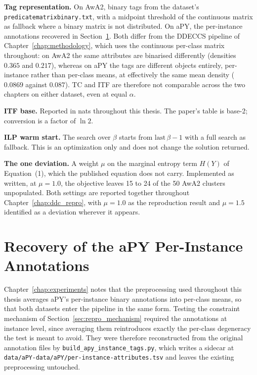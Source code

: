 \textbf{Tag representation.} On AwA2, binary tags from the dataset's \texttt{predicate\-matrix\-binary.txt}, with a midpoint threshold of the continuous matrix as fallback where a binary matrix is not distributed. On aPY, the per-instance annotations recovered in Section~\ref{sec:c_apy_tags}. Both differ from the DDECCS pipeline of Chapter~\ref{chap:methodology}, which uses the continuous per-class matrix throughout: on AwA2 the same attributes are binarised differently (densities $0.365$ and $0.217$), whereas on aPY the tags are different objects entirely, per-instance rather than per-class means, at effectively the same mean density ($0.0869$ against $0.087$). TC and ITF are therefore not comparable across the two chapters on either dataset, even at equal $\alpha$.

\textbf{ITF base.} Reported in nats throughout this thesis. The paper's table is base-2; conversion is a factor of $\ln 2$.

\textbf{ILP warm start.} The search over $\beta$ starts from $\text{last}\,\beta - 1$ with a full search as fallback. This is an optimization only and does not change the solution returned.

\textbf{The one deviation.} A weight $\mu$ on the marginal entropy term $H(Y)$ of Equation~(1), which the published equation does not carry. Implemented as written, at $\mu = 1.0$, the objective leaves 15 to 24 of the 50 AwA2 clusters unpopulated. Both settings are reported together throughout Chapter~\ref{chap:ddc_repro}, with $\mu = 1.0$ as the reproduction result and $\mu = 1.5$ identified as a deviation wherever it appears.

\section{Recovery of the aPY Per-Instance Annotations}
\label{sec:c_apy_tags}

Chapter~\ref{chap:experiments} notes that the preprocessing used throughout this thesis averages aPY's per-instance binary annotations into per-class means, so that both datasets enter the pipeline in the same form. Testing the constraint mechanism of Section~\ref{sec:repro_mechanism} required the annotations at instance level, since averaging them reintroduces exactly the per-class degeneracy the test is meant to avoid. They were therefore reconstructed from the original annotation files by \texttt{build\_apy\_instance\_tags.py}, which writes a sidecar at \texttt{data/aPY-data/aPY/per-instance-attributes.tsv} and leaves the existing preprocessing untouched.

